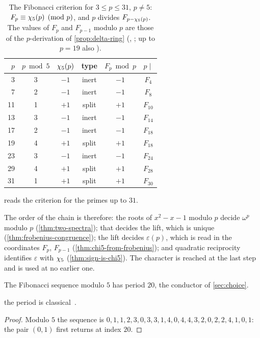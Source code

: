 \begin{table}[ht]
\centering
\caption{The Fibonacci criterion for $3\le p\le31$, $p\ne5$: $F_p\equiv\chi_5(p)\pmod p$, and $p$
divides $F_{p-\chi_5(p)}$.  The values of $F_p$ and $F_{p-1}$ modulo $p$ are those of the $p$-derivation of
\cref{prop:delta-ring} (, 
; up to $p=19$ also ).}
\label{tab:fib-split}
\begin{tabular}{rccccc}
\toprule
$p$ & $p\bmod5$ & $\chi_5(p)$ & type & $F_p\bmod p$ & $p\mid$ \\
\midrule
3  & 3 & $-1$ & inert & $-1$ & $F_4$ \\
7  & 2 & $-1$ & inert & $-1$ & $F_8$ \\
11 & 1 & $+1$ & split & $+1$ & $F_{10}$ \\
13 & 3 & $-1$ & inert & $-1$ & $F_{14}$ \\
17 & 2 & $-1$ & inert & $-1$ & $F_{18}$ \\
19 & 4 & $+1$ & split & $+1$ & $F_{18}$ \\
23 & 3 & $-1$ & inert & $-1$ & $F_{24}$ \\
29 & 4 & $+1$ & split & $+1$ & $F_{28}$ \\
31 & 1 & $+1$ & split & $+1$ & $F_{30}$ \\
\bottomrule
\end{tabular}
\end{table}

 reads the criterion for the primes up to $31$.

The order of the chain is therefore: the roots of $x^2-x-1$ modulo $p$ decide $\omega^p$ modulo $p$
(\cref{thm:two-spectra}); that decides the lift, which is unique (\cref{thm:frobenius-congruence}); the
lift decides $\varepsilon(p)$, which is read in the coordinates $F_p$, $F_{p-1}$
(\cref{thm:chi5-from-frobenius}); and quadratic reciprocity identifies $\varepsilon$ with $\chi_5$
(\cref{thm:sign-is-chi5}).  The character is reached at the last step and is used at no earlier one.

\begin{proposition}\label{prop:pisano}
The Fibonacci sequence modulo $5$ has period $20$, the conductor of \cref{sec:choice}.
\end{proposition}
the period is classical~\cite{wall60}.
\begin{proof}
Modulo $5$ the sequence is $0,1,1,2,3,0,3,3,1,4,0,4,4,3,2,0,2,2,4,1,0,1$: the pair $(0,1)$ first
returns at index $20$.
\end{proof}

